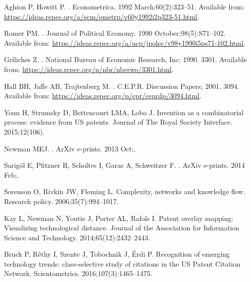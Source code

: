 \documentclass[12pt,twoside,a4paper]{article}
\begin{document}
%
%


\begin{thebibliography}{10}

Aghion P, Howitt P.
.
\newblock Econometrica. 1992 March;60(2):323--51.
\newblock Available from:
  \url{https://ideas.repec.org/a/ecm/emetrp/v60y1992i2p323-51.html}.

Romer PM.
.
\newblock Journal of Political Economy. 1990 October;98(5):S71--102.
\newblock Available from:
  \url{https://ideas.repec.org/a/ucp/jpolec/v98y1990i5ps71-102.html}.

Griliches Z.
.
\newblock National Bureau of Economic Research, Inc; 1990. 3301.
\newblock Available from: \url{https://ideas.repec.org/p/nbr/nberwo/3301.html}.

Hall BH, Jaffe AB, Trajtenberg M.
.
\newblock C.E.P.R. Discussion Papers; 2001. 3094.
\newblock Available from: \url{https://ideas.repec.org/p/cpr/ceprdp/3094.html}.

Youn H, Strumsky D, Bettencourt LMA, Lobo J.
\newblock Invention as a combinatorial process: evidence from US patents.
\newblock Journal of The Royal Society Interface. 2015;12(106).

{Newman} MEJ.
.
\newblock ArXiv e-prints. 2013 Oct;.

{Sarig{\"o}l} E, {Pfitzner} R, {Scholtes} I, {Garas} A, {Schweitzer} F.
.
\newblock ArXiv e-prints. 2014 Feb;.

Sorenson O, Rivkin JW, Fleming L.
\newblock Complexity, networks and knowledge flow.
\newblock Research policy. 2006;35(7):994--1017.

Kay L, Newman N, Youtie J, Porter AL, Rafols I.
\newblock Patent overlay mapping: Visualizing technological distance.
\newblock Journal of the Association for Information Science and Technology.
  2014;65(12):2432--2443.

Bruck P, R{\'e}thy I, Szente J, Tobochnik J, {\'E}rdi P.
\newblock Recognition of emerging technology trends: class-selective study of
  citations in the US Patent Citation Network.
\newblock Scientometrics. 2016;107(3):1465--1475.


\end{thebibliography}
\end{document}
